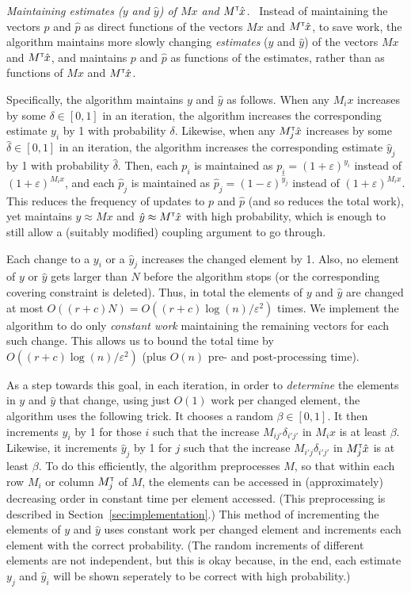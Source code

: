 \documentclass[11pt]{svjour3} \usepackage{fullpage}
\renewcommand{\paragraph}[1]{\smallskip\vspace{2pt}\par{\em #1}~}
\newcommand{\primalOf}[1]{{{#1}}}
\newcommand{\dualOf}[1]{{\hat{#1}}}
\newcommand{\MM}{M}
\newcommand{\xp}{\primalOf x}
\newcommand{\yp}{\primalOf y}
\newcommand{\pp}{\primalOf p}
\newcommand{\xd}{\dualOf x}
\newcommand{\yd}{\dualOf y}
\newcommand{\pd}{\dualOf p}
\newcommand{\eps}{\varepsilon}
\newcommand{\tran}{^{\scriptscriptstyle \sf T\hspace*{-0.05em}}}
\begin{document}
\paragraph{Maintaining estimates ($\yp$ and $\yd$) of $M\xp$ and $M\tran\xd$.}
Instead of maintaining the vectors $\pp$ and $\pd$ as direct functions
of the vectors $M\xp$ and $M\tran\xd$, 
to save work,
the algorithm maintains more slowly changing {\em estimates} ($\yp$ and $\yd$)
of the vectors $\MM \xp$ and $\MM\tran \xd$,
and maintains $\pp$ and $\pd$ as functions of the estimates,
rather than as functions of $M\xp$ and $M\tran \xd$.

Specifically, the algorithm maintains $\yp$ and $\yd$ as follows.
When any $\MM_i\xp$ increases by some $\delta \in [0,1]$ in an iteration,
the algorithm increases the corresponding estimate $\yp_i$ 
by 1 with probability $\delta$.
Likewise, when any $\MM\tran_j\xd$ increases by some $\hat\delta\in [0,1]$ in an iteration,
the algorithm increases the corresponding estimate $\yd_j$ 
by 1 with probability $\hat\delta$.
Then, each $\pp_i$ is maintained as $\pp_i = (1+\eps)^{\yp_i}$ instead of $(1+\eps)^{M_i \xp}$,
and each $\pd_j$ is maintained as $\pd_j = (1-\eps)^{\yd_j}$ instead of $(1+\eps)^{M_i \xp}$.
This reduces the frequency of updates to $\pp$ and $\pd$ (and so reduces the total work),
yet maintains $\yp\approx \MM\xp$ and $\yd\approx\MM\tran\xd$ 
with high probability,
which is enough to still allow a (suitably modified) coupling argument to go through.

Each change to a $\yp_i$ or a $\yd_j$ increases the changed element by 1.
Also, no element of $\yp$ or $\yd$ gets larger than $N$ before the algorithm stops 
(or the corresponding covering constraint is deleted).
Thus, in total the elements
of $\yp$ and $\yd$ are changed at most $O((r+c)N) = O((r+c)\log(n)/\eps^2)$ times.
We implement the algorithm to do only {\em constant work} maintaining the remaining
vectors for each such change.
This allows us to bound the total time 
by $O((r+c)\log(n)/\eps^2)$ (plus $O(n)$ pre- and post-processing time).

As a step towards this goal, 
in each iteration, in order to {\em determine} the elements in $\yp$ and $\yd$ that
change, using just $O(1)$ work per changed element, the algorithm uses the following trick.
It chooses a random $\beta\in[0,1]$.
It then increments $\yp_i$ by 1 for those $i$ 
such that the increase $\MM_{ij'}\delta_{i'j'}$ in $\MM_i\xp$ is at least $\beta$.
Likewise, it increments $\yd_j$ by 1 for $j$ such that the increase 
$\MM_{i'j}\delta_{i'j'}$ in $\MM\tran_j\xd$ is at least $\beta$.
To do this efficiently, the algorithm preprocesses $\MM$,
so that within each row $\MM_i$ or column $\MM\tran_j$ of $\MM$,
the elements can be accessed in (approximately) decreasing order
in constant time per element accessed.
(This preprocessing is described in Section~\ref{sec:implementation}.)
This method of incrementing the elements of $\yp$ and $\yd$ uses constant work per changed element and increments each element with the correct probability.
(The random increments of different elements are not independent,
but this is okay because, in the end, each estimate $\yp_j$ and $\yd_i$
will be shown seperately to be correct with high probability.)
\end{document}
